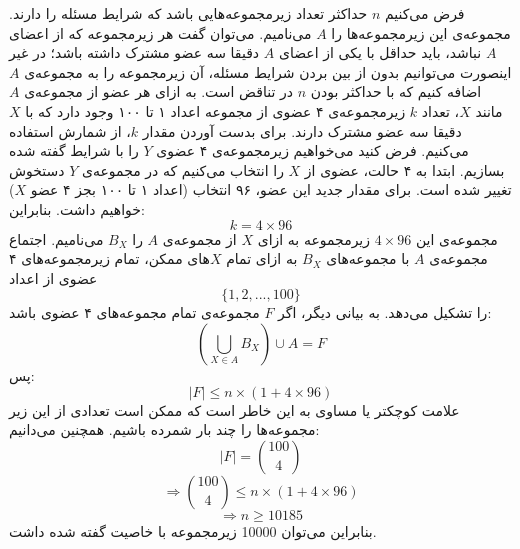 \p
فرض می‌کنیم
$n$
حداکثر تعداد زیرمجموعه‌هایی باشد که شرایط مسئله را دارند. مجموعه‌ی این زیرمجموعه‌ها را
$A$
می‌نامیم. می‌توان گفت هر زیرمجموعه که از اعضای
$A$
نباشد، باید حداقل با یکی از اعضای
$A$
دقیقا سه عضو مشترک داشته باشد؛
در غیر اینصورت می‌توانیم بدون از بین بردن شرایط مسئله، آن زیرمجموعه را به مجموعه‌ی
$A$
اضافه کنیم که با حداکثر بودن
$n$
در تناقض است.
به ازای هر عضو از مجموعه‌ی 
$A$
مانند
$X$،
تعداد
$k$
زیرمجموعه‌ی ۴ عضوی از مجموعه اعداد ۱ تا ۱۰۰ وجود دارد که با
$X$
دقیقا سه عضو مشترک دارند. برای بدست آوردن مقدار
$k$،
از شمارش استفاده می‌کنیم. فرض کنید می‌خواهیم زیرمجموعه‌ی ۴ عضوی
$Y$
را با شرایط گفته شده بسازیم. ابتدا به ۴ حالت، عضوی از
$X$
را انتخاب می‌کنیم که در مجموعه‌ی
$Y$
دستخوش تغییر شده است. برای مقدار جدید این عضو، ۹۶ انتخاب
(اعداد ۱ تا ۱۰۰ بجز ۴ عضو $X$)
خواهیم داشت. بنابراین:
$$k = 4 \times 96$$
مجموعه‌ی این
$4 \times 96$
زیرمجموعه به ازای
$X$
از مجموعه‌ی
$A$
را
$B_X$
‌می‌نامیم.
اجتماع مجموعه‌ی
$A$
با مجموعه‌های
$B_X$
به ازای تمام
$X$های
ممکن، تمام زیرمجموعه‌های ۴ عضوی از اعداد
$$\{1,2,...,100\}$$
را تشکیل می‌دهد.
به بیانی دیگر، اگر
$F$
مجموعه‌ی تمام مجموعه‌های ۴ عضوی باشد:
$$(\bigcup\limits_{X \in A} B_X) \cup A = F$$
پس:
$$|F| \leq n \times (1 + 4 \times 96)$$
علامت کوچکتر یا مساوی به این خاطر است که ممکن است تعدادی از این زیر مجموعه‌ها را چند بار شمرده باشیم.
همچنین می‌دانیم:
$$|F| = {100 \choose 4} $$
$$\Rightarrow {100 \choose 4} \leq n \times (1 + 4 \times 96)$$
$$\Rightarrow n \geq 10185$$
بنابراین می‌توان 10000 زیرمجموعه با خاصیت گفته شده داشت.